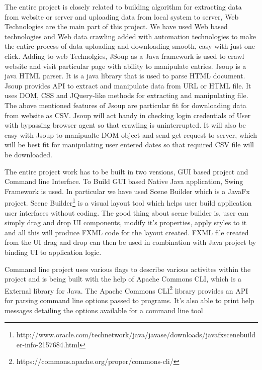 \documentclass[article,type=msc,colorback,accentcolor=tud9c,twoside,11pt]{tudthesis}
\begin{document}
The entire project is closely related to building algorithm for extracting data from website or server and uploading data from local system to server, Web Technologies are the main part of this project. We have used Web based technologies and Web data crawling added with automation technologies to make the entire process of data uploading and downloading smooth, easy with just one click. Adding to web Technolgies, JSoup\cite{Jsoup} as a Java framework is used to crawl website and visit particular page with ability to manipulate entries. Jsoup is a java HTML parser. It is a java library that is used to parse HTML\cite{BeaqleJSHTML} document. Jsoup provides API to extract and manipulate data from URL or HTML file. It uses DOM, CSS and JQuery-like methods for extracting and manipulating file. The above mentioned features of Jsoup are particular fit for downloading data from website as CSV. Jsoup will act handy in checking login credentials of User with bypassing browser agent so that crawling is uninterrupted. It will also be easy with Jsoup to manipualte DOM object and send get request to server, which will be best fit for manipulating user entered dates so that required CSV file will be downloaded. 

The entire project work has to be built in two versions, GUI based project and Command line Interface. To Build GUI based Native Java application, Swing Framework is used. In particular we have used Scene Builder which is a JavaFx\cite{JavaFx} project. Scene Builder\footnote{http://www.oracle.com/technetwork/java/javase/downloads/javafxscenebuilder-info-2157684.html} is a visual layout tool which helps user build application user interfaces without coding. The good thing about scene builder is, user can simply drag and drop UI components, modify it's properties, apply styles to it and all this will produce FXML code for the layout created. FXML file created from the UI drag and drop can then be used in combination with Java project by binding UI to application logic. 

Command line project uses various flags to describe various activites within the project and is being built with the help of Apache Commons CLI, which is a External library for Java. The Apache Commons CLI\footnote{https://commons.apache.org/proper/commons-cli/} library provides an API for parsing command line options passed to programs. It's also able to print help messages detailing the options available for a command line tool
 
\end{document}
